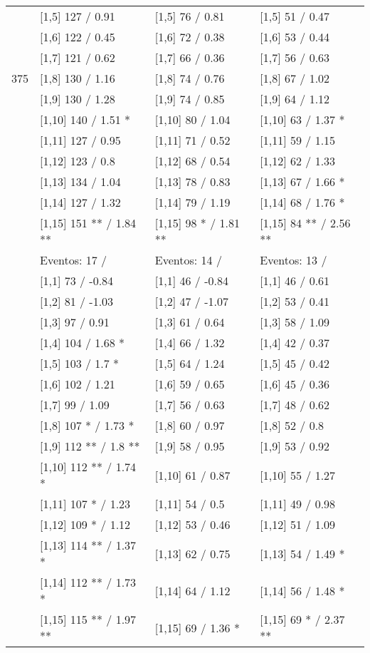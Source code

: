 \begin{table}
\begin{tabular}[t]{llll}
 & {}[1,5] 127  / 0.91 & {}[1,5] 76  / 0.81 & {}[1,5] 51  / 0.47\\
 & {}[1,6] 122  / 0.45 & {}[1,6] 72  / 0.38 & {}[1,6] 53  / 0.44\\
 & {}[1,7] 121  / 0.62 & {}[1,7] 66  / 0.36 & {}[1,7] 56  / 0.63\\
375 & {}[1,8] 130  / 1.16 & {}[1,8] 74  / 0.76 & {}[1,8] 67  / 1.02\\
\addlinespace
 & {}[1,9] 130  / 1.28 & {}[1,9] 74  / 0.85 & {}[1,9] 64  / 1.12\\
 & {}[1,10] 140  / 1.51 * & {}[1,10] 80  / 1.04 & {}[1,10] 63  / 1.37 *\\
 & {}[1,11] 127  / 0.95 & {}[1,11] 71  / 0.52 & {}[1,11] 59  / 1.15\\
 & {}[1,12] 123  / 0.8 & {}[1,12] 68  / 0.54 & {}[1,12] 62  / 1.33\\
 & {}[1,13] 134  / 1.04 & {}[1,13] 78  / 0.83 & {}[1,13] 67  / 1.66 *\\
\addlinespace
 & {}[1,14] 127  / 1.32 & {}[1,14] 79  / 1.19 & {}[1,14] 68  / 1.76 *\\
 & {}[1,15] 151 ** / 1.84 ** & {}[1,15] 98 * / 1.81 ** & {}[1,15] 84 ** / 2.56 **\\
 & Eventos:  17 / & Eventos:  14 / & Eventos:  13 /\\
 & {}[1,1] 73  / -0.84 & {}[1,1] 46  / -0.84 & {}[1,1] 46  / 0.61\\
 & {}[1,2] 81  / -1.03 & {}[1,2] 47  / -1.07 & {}[1,2] 53  / 0.41\\
\addlinespace
 & {}[1,3] 97  / 0.91 & {}[1,3] 61  / 0.64 & {}[1,3] 58  / 1.09\\
 & {}[1,4] 104  / 1.68 * & {}[1,4] 66  / 1.32 & {}[1,4] 42  / 0.37\\
 & {}[1,5] 103  / 1.7 * & {}[1,5] 64  / 1.24 & {}[1,5] 45  / 0.42\\
 & {}[1,6] 102  / 1.21 & {}[1,6] 59  / 0.65 & {}[1,6] 45  / 0.36\\
 & {}[1,7] 99  / 1.09 & {}[1,7] 56  / 0.63 & {}[1,7] 48  / 0.62\\
\addlinespace
500 & {}[1,8] 107 * / 1.73 * & {}[1,8] 60  / 0.97 & {}[1,8] 52  / 0.8\\
 & {}[1,9] 112 ** / 1.8 ** & {}[1,9] 58  / 0.95 & {}[1,9] 53  / 0.92\\
 & {}[1,10] 112 ** / 1.74 * & {}[1,10] 61  / 0.87 & {}[1,10] 55  / 1.27\\
 & {}[1,11] 107 * / 1.23 & {}[1,11] 54  / 0.5 & {}[1,11] 49  / 0.98\\
 & {}[1,12] 109 * / 1.12 & {}[1,12] 53  / 0.46 & {}[1,12] 51  / 1.09\\
\addlinespace
 & {}[1,13] 114 ** / 1.37 * & {}[1,13] 62  / 0.75 & {}[1,13] 54  / 1.49 *\\
 & {}[1,14] 112 ** / 1.73 * & {}[1,14] 64  / 1.12 & {}[1,14] 56  / 1.48 *\\
 & {}[1,15] 115 ** / 1.97 ** & {}[1,15] 69  / 1.36 * & {}[1,15] 69 * / 2.37 **\\
\bottomrule
\end{tabular}
\end{table}

